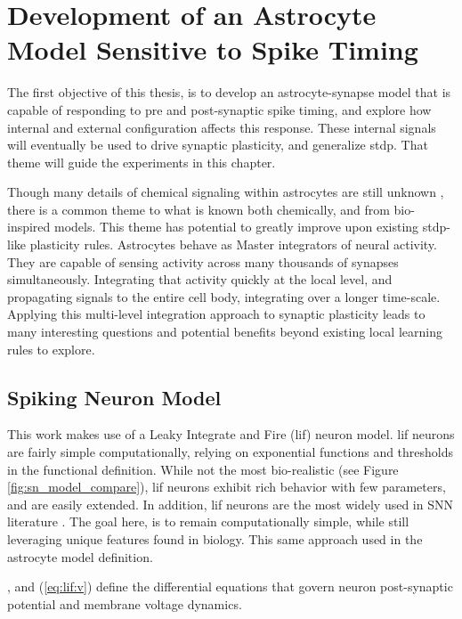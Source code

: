%

\chapter{Development of an Astrocyte Model Sensitive to Spike Timing} \label{chapter:obj1}
The first objective of this thesis, is to develop an astrocyte-synapse model
that is capable of responding to pre and post-synaptic spike timing, and
explore how internal and external configuration affects this response. These
internal signals will eventually be used to drive synaptic plasticity, and
generalize \gls{stdp}. That theme will guide the experiments in this chapter.

Though many details of chemical signaling within astrocytes are still unknown
\parencite{manninen_2018}, there is a common theme to what is known both chemically,
and from bio-inspired models. This theme has potential to greatly improve upon
existing \gls{stdp}-like plasticity rules. Astrocytes behave as Master integrators of
neural activity. They are capable of sensing activity across many thousands of
synapses simultaneously. Integrating that activity quickly at the local level,
and propagating signals to the entire cell body, integrating over a longer
time-scale. Applying this multi-level integration approach to synaptic
plasticity leads to many interesting questions and potential benefits beyond
existing local learning rules to explore.

\section{Spiking Neuron Model}
This work makes use of a Leaky Integrate and Fire (\gls{lif}) neuron model. \Gls{lif}
neurons are fairly simple computationally, relying on exponential functions
and thresholds in the functional definition. While not the most
bio-realistic (see Figure \ref{fig:sn_model_compare}), \gls{lif} neurons exhibit
rich behavior with few parameters, and are easily extended. In addition, \gls{lif}
neurons are the most widely used in SNN literature \parencite{ponulak_2011}. The
goal here, is to remain computationally simple, while still leveraging unique
features found in biology. This same approach used in the astrocyte model
definition.

, and (\ref{eq:lif:v}) define the differential equations
that govern neuron post-synaptic potential and membrane voltage dynamics.

